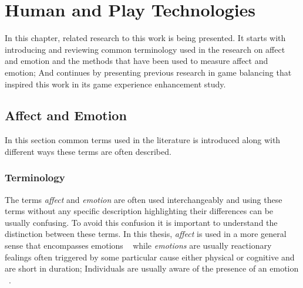 \documentclass{uofsthesis-cs}
\begin{document}

\chapter{Human and Play Technologies}
\label{chap:man-n-play}



In this chapter, related research to this work is being presented. It starts with introducing and reviewing common terminology used in the research on affect and emotion and the methods that have been used to measure affect and emotion; And continues by presenting previous research in game balancing that inspired this work in its game experience enhancement study.

\section{Affect and Emotion}

In this section common terms used in the literature is introduced along with different ways these terms are often described.

\subsection{Terminology}

The terms \textit{affect} and \textit{emotion} are often used interchangeably and using these terms without any specific description highlighting their differences can be usually confusing. To avoid this confusion it is important to understand the distinction between these terms. In this thesis, \textit{affect} is used in a more general sense that encompasses emotions ~\cite{forgas1995mood} while \textit{emotions} are usually reactionary fealings often triggered by some particular cause either physical or cognitive and are short in duration; Individuals are usually aware of the presence of an emotion ~\cite{paiva2007affective}.
\end{document}
